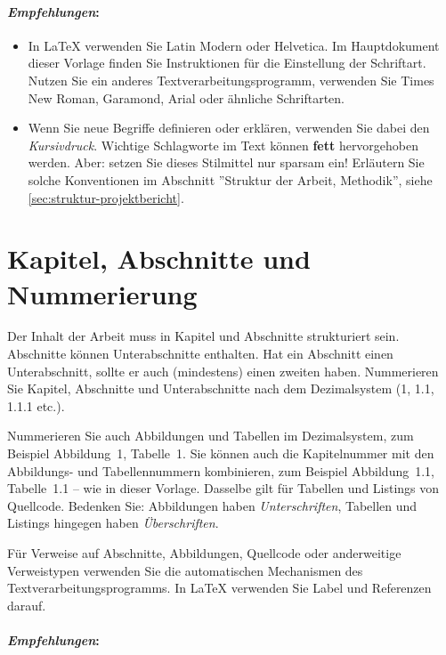 \paragraph{\textit{Empfehlungen}:}

\begin{itemize}
    \item In \LaTeX{} verwenden Sie Latin Modern oder Helvetica. Im Hauptdokument dieser Vorlage finden Sie Instruktionen für die Einstellung der Schriftart. Nutzen Sie ein anderes Textverarbeitungsprogramm, verwenden Sie Times New Roman, Garamond, Arial oder ähnliche Schriftarten.
    \item Wenn Sie neue Begriffe definieren oder erklären, verwenden Sie dabei den \textit{Kursivdruck}. Wichtige Schlagworte im Text können \textbf{fett} hervorgehoben werden. Aber: setzen Sie dieses Stilmittel nur sparsam ein! Erläutern Sie solche Konventionen im Abschnitt ''Struktur der Arbeit, Methodik'', siehe \ref{sec:struktur-projektbericht}.
\end{itemize}




\section{Kapitel, Abschnitte und Nummerierung}

Der Inhalt der Arbeit muss in Kapitel und Abschnitte strukturiert sein. Abschnitte können Unterabschnitte enthalten. Hat ein Abschnitt einen Unterabschnitt, sollte er auch (mindestens) einen zweiten haben. Nummerieren Sie Kapitel, Abschnitte und Unterabschnitte nach dem Dezimalsystem (1, 1.1, 1.1.1 etc.). 

Nummerieren Sie auch Abbildungen und Tabellen im Dezimalsystem, zum Beispiel Abbildung~1, Tabelle~1. Sie können auch die Kapitelnummer mit den Abbildungs- und Tabellennummern kombinieren, zum Beispiel Abbildung~1.1, Tabelle~1.1 -- wie in dieser Vorlage. Dasselbe gilt für Tabellen und Listings von Quellcode. Bedenken Sie: Abbildungen haben \textit{Unterschriften}, Tabellen und Listings hingegen haben \textit{Überschriften}.

Für Verweise auf Abschnitte, Abbildungen, Quellcode oder anderweitige Verweistypen verwenden Sie die automatischen Mechanismen des Textverarbeitungsprogramms. In \LaTeX{} verwenden Sie Label und Referenzen darauf.

\paragraph{\textit{Empfehlungen}:}

